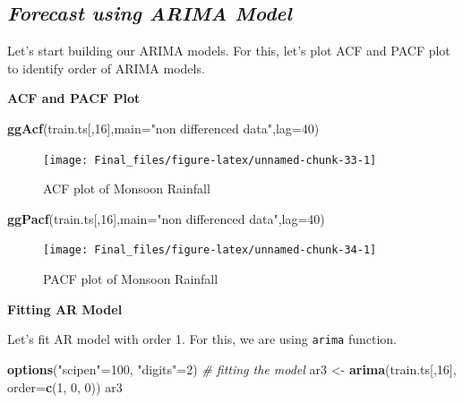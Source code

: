 \documentclass[12pt,openany]{book}
\newenvironment{Shaded}{\begin{snugshade}}{\end{snugshade}}
\newcommand{\CommentTok}[1]{\textcolor[rgb]{0.56,0.35,0.01}{\textit{#1}}}
\newcommand{\DataTypeTok}[1]{\textcolor[rgb]{0.13,0.29,0.53}{#1}}
\newcommand{\DecValTok}[1]{\textcolor[rgb]{0.00,0.00,0.81}{#1}}
\newcommand{\KeywordTok}[1]{\textcolor[rgb]{0.13,0.29,0.53}{\textbf{#1}}}
\newcommand{\NormalTok}[1]{#1}
\newcommand{\StringTok}[1]{\textcolor[rgb]{0.31,0.60,0.02}{#1}}
\begin{document}
\hypertarget{forecast-using-arima-model}{%
\subsection{\texorpdfstring{\emph{\textbf{\emph{Forecast using ARIMA Model}}}}{Forecast using ARIMA Model}}\label{forecast-using-arima-model}}

Let's start building our ARIMA models. For this, let's plot ACF and PACF plot to identify order of ARIMA models.

\textbf{ACF and PACF Plot}

\begin{Shaded}
\begin{Highlighting}[]
\KeywordTok{ggAcf}\NormalTok{(train.ts[,}\DecValTok{16}\NormalTok{],}\DataTypeTok{main=}\StringTok{"non differenced data"}\NormalTok{,}\DataTypeTok{lag=}\DecValTok{40}\NormalTok{)}
\end{Highlighting}
\end{Shaded}

\begin{figure}

{\centering \texttt{[image: Final\_files/figure-latex/unnamed-chunk-33-1]} 

}

\caption{ACF plot of Monsoon Rainfall}\label{fig:unnamed-chunk-33}
\end{figure}

\begin{Shaded}
\begin{Highlighting}[]
\KeywordTok{ggPacf}\NormalTok{(train.ts[,}\DecValTok{16}\NormalTok{],}\DataTypeTok{main=}\StringTok{"non differenced data"}\NormalTok{,}\DataTypeTok{lag=}\DecValTok{40}\NormalTok{)}
\end{Highlighting}
\end{Shaded}

\begin{figure}

{\centering \texttt{[image: Final\_files/figure-latex/unnamed-chunk-34-1]} 

}

\caption{PACF plot of Monsoon Rainfall}\label{fig:unnamed-chunk-34}
\end{figure}

\textbf{Fitting AR Model}

Let's fit AR model with order 1. For this, we are using \texttt{arima} function.

\begin{Shaded}
\begin{Highlighting}[]
\KeywordTok{options}\NormalTok{(}\StringTok{"scipen"}\NormalTok{=}\DecValTok{100}\NormalTok{, }\StringTok{"digits"}\NormalTok{=}\DecValTok{2}\NormalTok{)}
\CommentTok{# fitting the model}
\NormalTok{ar3 <-}\StringTok{ }\KeywordTok{arima}\NormalTok{(train.ts[,}\DecValTok{16}\NormalTok{], }\DataTypeTok{order=}\KeywordTok{c}\NormalTok{(}\DecValTok{1}\NormalTok{, }\DecValTok{0}\NormalTok{, }\DecValTok{0}\NormalTok{))}
\NormalTok{ar3}
\end{Highlighting}
\end{Shaded}
\end{document}

